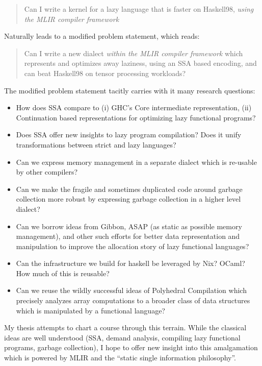 \documentclass{book}
\begin{document}
\begin{quote}
Can I write a kernel for a lazy language that is faster on Haskell98, 
\emph{using the MLIR compiler framework}
\end{quote}

Naturally leads to a modified problem statement, which reads:

\begin{quote}
Can I write a new dialect \emph{within the MLIR compiler framework} which represents
and optimizes away laziness, using an SSA based encoding, and can beat
Haskell98 on tensor processing workloads?
\end{quote}

The modified problem statement tacitly carries with it many research questions:
\begin{itemize}
\item How does SSA compare to (i) GHC's Core intermediate representation, (ii) 
      Continuation based representations for optimizing lazy functional programs?
\item Does SSA offer new insights to lazy program compilation? Does it unify 
   transformations between strict and lazy languages?
\item Can we express memory management in a separate dialect which is re-usable
      by other compilers?
\item Can we make the fragile and sometimes duplicated code around garbage collection
      more robust by expressing garbage collection in a higher level dialect?
\item Can we borrow ideas from Gibbon, ASAP (as static as possible memory management),
      and other such efforts for better data representation and manipulation to 
      improve the allocation story of lazy functional languages?
\item Can the infrastructure we build for haskell be leveraged by Nix? OCaml? How
      much of this is reusable?
\item Can we reuse the wildly successful ideas of Polyhedral Compilation which
      precisely analyzes array computations to a broader class of data structures
      which is manipulated by a functional language?
\end{itemize}

My thesis attempts to chart a course through this terrain. While the classical
ideas are well understood (SSA, demand analysis, compiling lazy functional programs,
garbage collection), I
hope to offer new insight into this amalgamation which is powered by MLIR and
the ``static single information philosophy''. 
\end{document}

